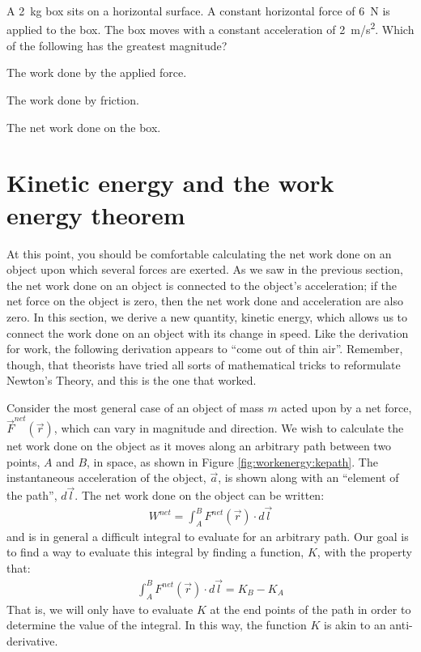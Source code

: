 \begin{checkpoint}
\begin{MCquestion}{A \SI{2}{kg} box sits on a horizontal surface. A constant horizontal force of \SI{6}{N} is applied to the box. The box moves with a constant acceleration of \SI{2}{m/s^2}. Which of the following has the greatest magnitude?}
\item The work done by the applied force. \correct
\item The work done by friction.
\item The net work done on the box.
\end{MCquestion}
\end{checkpoint}

\section{Kinetic energy and the work energy theorem}
At this point, you should be comfortable calculating the net work done on an object upon which several forces are exerted. As we saw in the previous section, the net work done on an object is connected to the object's acceleration; if the net force on the object is zero, then the net work done and acceleration are also zero. In this section, we derive a new quantity, kinetic energy, which allows us to connect the work done on an object with its change in speed. Like the derivation for work, the following derivation appears to ``come out of thin air''. Remember, though, that theorists have tried all sorts of mathematical tricks to reformulate Newton's Theory, and this is the one that worked.

Consider the most general case of an object of mass $m$ acted upon by a net force, $\vec F^{net}(\vec r)$, which can vary in magnitude and direction. We wish to calculate the  net work done on the object as it moves along an arbitrary path between two points, $A$ and $B$, in space, as shown in Figure \ref{fig:workenergy:kepath}. The instantaneous acceleration of the object, $\vec a$, is shown along with an ``element of the path'', $d\vec l$. 
The net work done on the object can be written:
\begin{align*}
W^{net} = \int_A^B F^{net}(\vec r) \cdot d\vec l
\end{align*} 
and is in general a difficult integral to evaluate for an arbitrary path. Our goal is to find a way to evaluate this integral by finding a function, $K$, with the property that:
\begin{align*}
\int_A^B F^{net}(\vec r) \cdot d\vec l =K_B - K_A
\end{align*}
That is, we will only have to evaluate $K$ at the end points of the path in order to determine the value of the integral. In this way, the function $K$ is akin to an anti-derivative.  


